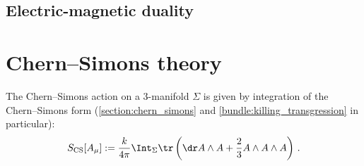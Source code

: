 \subsection{Electric-magnetic duality}


\section{Chern--Simons theory}\label{section:chern_simons_theory}

    The Chern--Simons action on a 3-manifold $\Sigma$ is given by integration of the Chern--Simons form (\cref{section:chern_simons} and \cref{bundle:killing_transgression} in particular):
    \begin{gather}
        S_{\mathrm{CS}}[A_\mu] := \frac{k}{4\pi}\Int_\Sigma\tr\left(\dr A\wedge A + \frac{2}{3}A\wedge A\wedge A\right)\,.
    \end{gather}